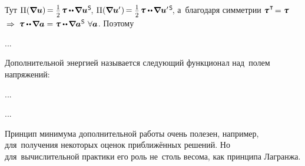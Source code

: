 \begin{otherlanguage}{russian}
\vspace{-0.36em} \noindent Тут
${\Pi(\boldnabla \bm{u}) \hspace{-0.24ex} = \smalldisplaystyleonehalf \hspace{.2ex} \mathboldtau \dotdotp \hspace{-0.2ex} \boldnabla \bm{u}^{\hspace{.08ex}\mathsf{S}}\hspace{-0.32ex}}$,
${\Pi(\boldnabla \bm{u}'\hspace{.1ex}) \hspace{-0.24ex} = \smalldisplaystyleonehalf \hspace{.2ex} \mathboldtau \dotdotp \hspace{-0.2ex} \boldnabla \bm{u}'^{\hspace{.25ex}\mathsf{S}}\hspace{-0.32ex}}$,
а~благодаря симметрии %
${\mathboldtau^{\hspace{.12ex}\T} \hspace{-0.32ex} = \mathboldtau}$ ${\hspace{.4ex}\Rightarrow\hspace{.2ex}}$ ${\mathboldtau \dotdotp \hspace{-0.2ex} \boldnabla \bm{a} = \mathboldtau \dotdotp \hspace{-0.2ex} \boldnabla \bm{a}^{\hspace{.08ex}\mathsf{S}} \hspace{.8ex}\forall \bm{a}}$. Поэтому

\nopagebreak ...







Дополнительной энергией называется следующий функционал над~полем напряжений:

...



...

Принцип минимума дополнительной работы очень полезен, например, для~получения некоторых оценок приближённых решений. Но для~вычислительной практики его роль не~столь весома, как принципа Лагранжа.


\end{otherlanguage}

